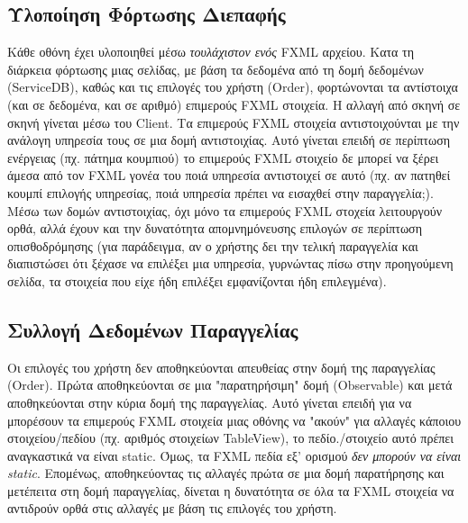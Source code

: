         \subsection{Υλοποίηση Φόρτωσης Διεπαφής}
        \label{sec:SubSectionName2.1.3}
        Κάθε οθόνη έχει υλοποιηθεί μέσω \textit{τουλάχιστον ενός} FXML αρχείου. Κατα τη διάρκεια φόρτωσης μιας σελίδας, με βάση τα δεδομένα από τη δομή δεδομένων (ServiceDB), καθώς και τις επιλογές του χρήστη (Order), φορτώνονται τα αντίστοιχα (και σε δεδομένα, και σε αριθμό) επιμερούς FXML στοιχεία. Η αλλαγή από σκηνή σε σκηνή γίνεται μέσω του Client. 
        \newline
        \newline
        Τα επιμερούς FXML στοιχεία αντιστοιχούνται με την ανάλογη υπηρεσία τους σε μια δομή αντιστοιχίας. Αυτό γίνεται επειδή σε περίπτωση ενέργειας (πχ. πάτημα κουμπιού) το επιμερούς FXML στοιχείο δε μπορεί να ξέρει άμεσα από τον FXML γονέα του ποιά υπηρεσία αντιστοιχεί σε αυτό (πχ. αν πατηθεί κουμπί επιλογής υπηρεσίας, ποιά υπηρεσία πρέπει να εισαχθεί στην παραγγελία;). Μέσω των δομών αντιστοιχίας, όχι μόνο τα επιμερούς FXML στοχεία λειτουργούν ορθά, αλλά έχουν και την δυνατότητα απομνημόνευσης επιλογών σε περίπτωση  οπισθοδρόμησης (για παράδειγμα, αν ο χρήστης δει την τελική παραγγελία και διαπιστώσει ότι ξέχασε να επιλέξει μια υπηρεσία, γυρνώντας πίσω στην προηγούμενη σελίδα, τα στοιχεία που είχε ήδη επιλέξει εμφανίζονται ήδη επιλεγμένα).
        \newpage

        \subsection{Συλλογή Δεδομένων Παραγγελίας}
        \label{sec:SubSectionName2.1.4}
        Οι επιλογές του χρήστη δεν αποθηκεύονται απευθείας στην δομή της παραγγελίας (Order). Πρώτα αποθηκεύονται σε μια "παρατηρήσιμη" δομή (Observable) και μετά αποθηκεύονται στην κύρια δομή της παραγγελίας. Αυτό γίνεται επειδή για να μπορέσουν τα επιμερούς FXML στοιχεία μιας οθόνης να "ακούν" για αλλαγές κάποιου στοιχείου/πεδίου (πχ. αριθμός στοιχείων TableView), το πεδίο./στοιχείο αυτό πρέπει αναγκαστικά να είναι static. Όμως, τα FXML πεδία εξ' ορισμού \textit{δεν μπορούν να είναι static}. Επομένως, αποθηκεύοντας τις αλλαγές πρώτα σε μια δομή παρατήρησης και μετέπειτα στη δομή παραγγελίας, δίνεται η δυνατότητα σε όλα τα FXML στοιχεία να αντιδρούν ορθά στις αλλαγές με βάση τις επιλογές του χρήστη.
        
